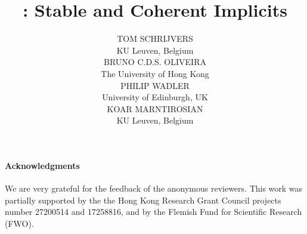 \documentclass{jfp1}
\title[Cochis: Stable and Coherent Implicits]{\name: Stable and Coherent Implicits}
\author[T. Schrijvers, B. Oliveira, P. Wadler and K. Marntirosian]
       {TOM SCHRIJVERS \\
        KU Leuven, Belgium \\
        BRUNO C.D.S. OLIVEIRA \\
        The University of Hong Kong \\
        PHILIP WADLER \\ 
        University of Edinburgh, UK \\
        KOAR MARNTIROSIAN \\
        KU Leuven, Belgium
}
\begin{document}
\begingroup

\maketitle

\begin{abstract}

\end{abstract}














%






\paragraph{Acknowledgments}
We are very grateful for the feedback of the anonymous reviewers.
This work was
partially supported by the the Hong Kong Research Grant Council
projects number 27200514 and 17258816, and by the Flemish Fund for 
Scientific Research (FWO).

\newpage


\newpage
\appendix






\endgroup
\end{document}
